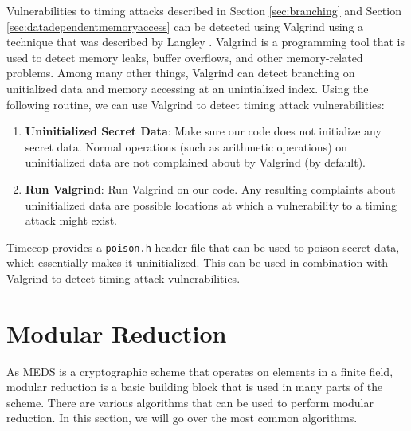 \documentclass[11pt,a4paper]{report}
\theoremstyle{definition}
\begin{document}
Vulnerabilities to timing attacks described in Section \ref{sec:branching} and Section \ref{sec:datadependentmemoryaccess} can be detected using Valgrind \cite{nethercote2007valgrind} using a technique that was described by Langley \cite{langley2010checking,langley2010ctgrind}. Valgrind is a programming tool that is used to detect memory leaks, buffer overflows, and other memory-related problems. Among many other things, Valgrind can detect branching on unitialized data and memory accessing at an unintialized index. Using the following routine, we can use Valgrind to detect timing attack vulnerabilities:
\begin{enumerate}
  \item \textbf{Uninitialized Secret Data}: Make sure our code does not initialize any secret data. Normal operations (such as arithmetic operations) on uninitialized data are not complained about by Valgrind (by default).
  \item \textbf{Run Valgrind}: Run Valgrind on our code. Any resulting complaints about uninitialized data are possible locations at which a vulnerability to a timing attack might exist.
\end{enumerate}

Timecop \cite{timecop} provides a \texttt{poison.h} header file that can be used to poison secret data, which essentially makes it uninitialized. This can be used in combination with Valgrind to detect timing attack vulnerabilities.

\section{Modular Reduction}
\label{sec:preliminariesmodularreduction}
As MEDS is a cryptographic scheme that operates on elements in a finite field, modular reduction is a basic building block that is used in many parts of the scheme. There are various algorithms that can be used to perform modular reduction. In this section, we will go over the most common algorithms.
\end{document}
